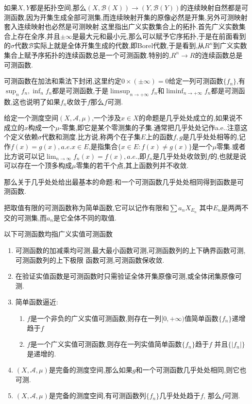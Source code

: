 如果$X,Y$都是拓扑空间,那么$(X,\mathscr{B}(X))\to(Y,\mathscr{B}(Y))$的连续映射自然都是可测函数,因为开集生成全部可测集,而连续映射开集的原像必然是开集,另外可测映射套入连续映射也必然是可测映射.这里指出广义实数集合上的拓扑.首先广义实数集合上存在全序,并且$\pm\infty$是最大元和最小元,那么可以赋予它序拓扑,于是在前面看到的$\sigma$代数$\mathscr{B}$实际上就是全体开集生成的代数,即Borel代数,于是看到,从$R^n$到广义实数集合上赋予序拓扑的连续函数总是一个可测函数.特别的,$R^n\to R$的连续函数总是可测函数.

可测函数在加法和乘法下封闭,这里约定$0\times(\pm\infty)=0$给定一列可测函数$\{f_n\}$,有$\sup_nf_n,\inf_nf_n$都是可测函数,于是$\limsup_ {n\to+\infty}f_n$和$\liminf_{n\to+\infty}f_n$都是可测函数,这也说明了如果$f_n$收敛于$f$那么$f$可测.

给定一个测度空间$(X,\mathscr{A},\mu)$,一个涉及$x\in X$的命题是几乎处处成立的,如果说不成立的$x$构成一个$\mu$-零集,即它是某个零测集的子集.通常把几乎处处记作a.e..注意这个定义依赖$\sigma$代数和测度.比方说,称两个在子集$E$上的函数$f,g$是几乎处处相等的,记作$f(x)=g(x),a.e.x\in E$,是指集合$\{x\in E:f(x)\not=g(x)\}$是一个$\mu$零集.或者比方说可以记$\lim_ {n\to\infty}f_n(x)=f(x),a.e.$,即$f_n$是几乎处处收敛到$f$的,也就是说可以存在一个顶多构成$\mu$零集的若干个点,其上函数列并不收敛.

那么关于几乎处处给出最基本的命题:和一个可测函数几乎处处相同得到函数是可测函数.

把取值有限的可测函数称为简单函数,它可以记作有限和$\sum a_n X_{E_n}$ 其中$E_n$是两两不交的可测集,而$a_n$是它全体不同的取值.


以下可测函数均指广义实值可测函数
\begin{enumerate}
  \item 可测函数的加减乘均可测,最大最小函数可测,可测函数列的上下确界函数可测,可测函数列的上下极限
  函数可测,可测函数保收敛.
  \item 在验证实值函数是可测函数时只需验证全体开集原像可测,或全体闭集原像可测.
  \item 简单函数逼近:
  \begin{enumerate}
  \item $f$是一个非负的广义实值可测函数,则存在一列$[0,+\infty)$值简单函数$\{f_n\}$递增趋于$f$
  \item $f$是一个广义实值可测函数,则存在一列实值简单函数$\{f_n\}$趋于$f$ 并且$\{|f_n|\}$是递增的.
  \end{enumerate}
  \item $(X,\mathscr{A},\mu)$是完备的测度空间,那么如果$g$和一个可测函数几乎处处相同,则它也可测.
  \item $(X,\mathscr{A},\mu)$是完备的测度空间,有可测函数列$\{f_n\}$几乎处处趋于$f$, 那么$f$可测.
\end{enumerate}

